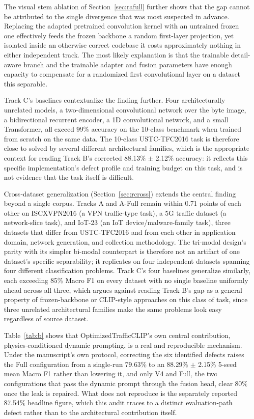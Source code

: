 \documentclass[journal]{IEEEtran}
\begin{document}
The visual stem ablation of Section~\ref{sec:rafull} further shows that the gap cannot be attributed to the single divergence that was most suspected in advance. Replacing the adapted pretrained convolution kernel with an untrained frozen one effectively feeds the frozen backbone a random first-layer projection, yet isolated inside an otherwise correct codebase it costs approximately nothing in either independent track. The most likely explanation is that the trainable detail-aware branch and the trainable adapter and fusion parameters have enough capacity to compensate for a randomized first convolutional layer on a dataset this separable.

Track C's baselines contextualize the finding further. Four architecturally unrelated models, a two-dimensional convolutional network over the byte image, a bidirectional recurrent encoder, a 1D convolutional network, and a small Transformer, all exceed 99\% accuracy on the 10-class benchmark when trained from scratch on the same data. The 10-class USTC-TFC2016 task is therefore close to solved by several different architectural families, which is the appropriate context for reading Track B's corrected 88.13\% $\pm$ 2.12\% accuracy: it reflects this specific implementation's defect profile and training budget on this task, and is not evidence that the task itself is difficult.

Cross-dataset generalization (Section~\ref{sec:rcross}) extends the central finding beyond a single corpus. Tracks A and A-Full remain within 0.71 points of each other on ISCXVPN2016 (a VPN traffic-type task), a 5G traffic dataset (a network-slice task), and IoT-23 (an IoT device/malware-family task), three datasets that differ from USTC-TFC2016 and from each other in application domain, network generation, and collection methodology. The tri-modal design's parity with its simpler bi-modal counterpart is therefore not an artifact of one dataset's specific separability; it replicates on four independent datasets spanning four different classification problems. Track C's four baselines generalize similarly, each exceeding 85\% Macro F1 on every dataset with no single baseline uniformly ahead across all three, which argues against reading Track B's gap as a general property of frozen-backbone or CLIP-style approaches on this class of task, since three unrelated architectural families make the same problems look easy regardless of source dataset.

Table~\ref{tab:b} shows that OptimizedTrafficCLIP's own central contribution, physics-conditioned dynamic prompting, is a real and reproducible mechanism. Under the manuscript's own protocol, correcting the six identified defects raises the Full configuration from a single-run 79.63\% to an 88.29\% $\pm$ 2.15\% 5-seed mean Macro F1 rather than lowering it, and only V4 and Full, the two configurations that pass the dynamic prompt through the fusion head, clear 80\% once the leak is repaired. What does not reproduce is the separately reported 87.54\% headline figure, which this audit traces to a distinct evaluation-path defect rather than to the architectural contribution itself.
\end{document}
